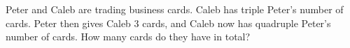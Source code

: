 Peter and Caleb are trading business cards. Caleb has triple Peter's number of cards. Peter then gives Caleb $3$ cards, and Caleb now has quadruple Peter's number of cards. How many cards do they have in total?
